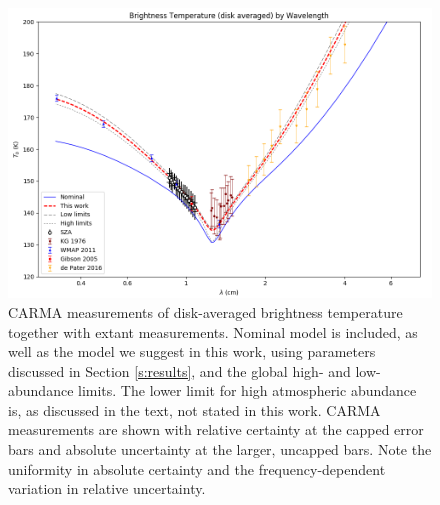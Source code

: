\documentclass{article}
\begin{document}
	\begin{figure}
		\centering
		\includegraphics[width=\textwidth]{final_models_wl.png}
		\caption{\label{fig:emission_wl}CARMA measurements of disk-averaged brightness temperature together with extant measurements. Nominal model is included, as well as the model we suggest in this work, using parameters discussed in Section \ref{s:results}, and the global high- and low-abundance limits. The lower limit for high atmospheric abundance is, as discussed in the text, not stated in this work. CARMA measurements are shown with relative certainty at the capped error bars and absolute uncertainty at the larger, uncapped bars. Note the uniformity in absolute certainty and the frequency-dependent variation in relative uncertainty.}
	\end{figure}
\end{document}
